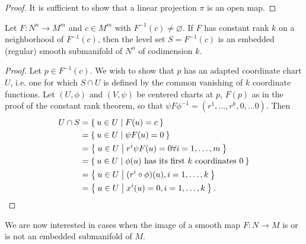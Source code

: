 \begin{proof}
It is sufficient to show that a linear projection $\pi$ is an open map.
\end{proof}

\begin{theorem}
Let $F: N^n \to M^m$ and $c \in M^m$ with $F^{-1}(c) \neq
\varnothing$. If $F$ has constant rank $k$ on a neighborhood of
$F^{-1}(c)$, then the level set $S = F^{-1}(c)$ is an embedded
(regular) smooth submanifold of $N^n$ of codimension $k$.
\end{theorem}

\begin{proof}
Let $p \in F^{-1}(c)$. We wish to show that $p$ has an adapted
coordinate chart $U$, i.e. one for which $S \cap U$ is defined by the
common vanishing of $k$ coordinate functions. Let $(U, \phi)$ and
$(V, \psi)$ be centered charts at $p$, $F(p)$ as in the proof of the
constant rank theorem, so that
$\psi F \phi^{-1} = (r^1, \dots, r^k, 0, \dots 0)$. Then
\begin{align*}
   U \cap S
&= \Set{ u \in U | F(u) = c } \\
&= \Set{ u \in U | \psi F(u) = 0 } \\
&= \Set{ u \in U | r^i \psi F(u) = 0 \forall i = 1, \dots, m } \\
&= \Set{ u \in U | \phi(u) \text{ has its first $k$ coordinates 0}} \\
&= \Set{ u \in U | (r^i \circ \phi)(u), i=1, \dots, k } \\
&= \Set{ u \in U | x^i(u) = 0, i=1, \dots, k }.
\end{align*}
\end{proof}

We are now interested in cases when the image of a smooth map $F: N
\to M$ is or is not an embedded submanifold of $M$.

